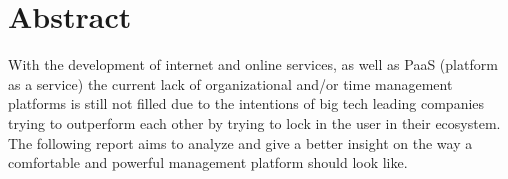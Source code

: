 \section{Abstract}
\par
With the development of internet and online services, as well as PaaS (platform as a service) the current lack of organizational and/or time management platforms is still not filled due to the intentions of big tech leading companies trying to outperform each other by trying to lock in the user in their ecosystem. The following report aims to analyze and give a better insight on the way a comfortable and powerful management platform should look like. 
